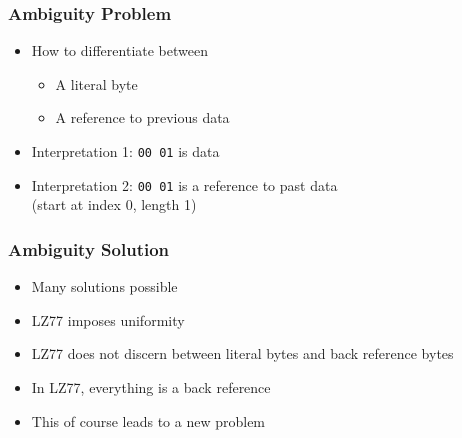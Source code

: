 \documentclass{../ucll-slides}
\newcommand{\hex}[1]{\texttt{\bfseries #1}}
\begin{document}
\begin{frame}
  \frametitle{Ambiguity Problem}
  \begin{center}
  \end{center}

  \begin{itemize}
    \item How to differentiate between
          \begin{itemize}
            \item A literal byte
            \item A reference to previous data
          \end{itemize}
    \item Interpretation 1: {\tt 00 01} is data
    \item Interpretation 2: {\tt 00 01} is a reference to past data \\ (start at index 0, length 1)
  \end{itemize}
\end{frame}

\begin{frame}
  \frametitle{Ambiguity Solution}
  \begin{itemize}
    \item Many solutions possible
    \item LZ77 imposes uniformity
    \item LZ77 does not discern between literal bytes and back reference bytes
    \item In LZ77, everything is a back reference
    \item This of course leads to a new problem
  \end{itemize}
\end{frame}
\end{document}
